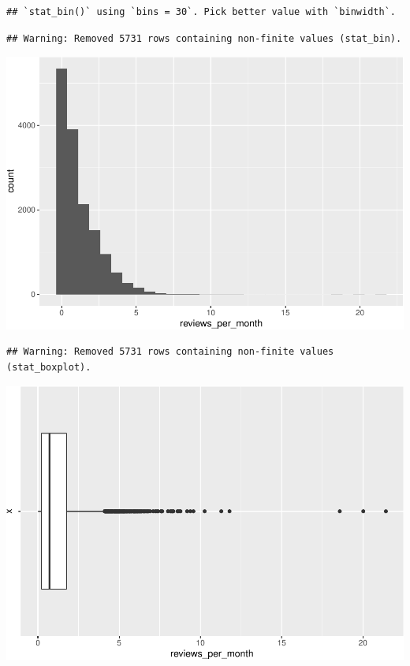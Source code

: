 \begin{verbatim}
## `stat_bin()` using `bins = 30`. Pick better value with `binwidth`.
\end{verbatim}

\begin{verbatim}
## Warning: Removed 5731 rows containing non-finite values (stat_bin).
\end{verbatim}

\includegraphics{anal_files/figure-latex/unnamed-chunk-9-54.pdf}

\begin{verbatim}
## Warning: Removed 5731 rows containing non-finite values (stat_boxplot).
\end{verbatim}

\includegraphics{anal_files/figure-latex/unnamed-chunk-9-55.pdf}

